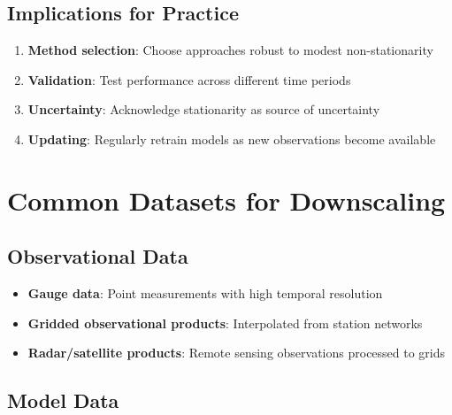 \documentclass[
  letterpaper,
  DIV=11,
  numbers=noendperiod]{scrreprt}
\providecommand{\tightlist}{%
  \setlength{\itemsep}{0pt}\setlength{\parskip}{0pt}}
\begin{document}
\subsection{Implications for Practice}\label{implications-for-practice}

\begin{enumerate}
\def\labelenumi{\arabic{enumi}.}
\tightlist
\item
  \textbf{Method selection}: Choose approaches robust to modest
  non-stationarity
\item
  \textbf{Validation}: Test performance across different time periods
\item
  \textbf{Uncertainty}: Acknowledge stationarity as source of
  uncertainty
\item
  \textbf{Updating}: Regularly retrain models as new observations become
  available
\end{enumerate}

\section{Common Datasets for
Downscaling}\label{common-datasets-for-downscaling}

\subsection{Observational Data}\label{observational-data}

\begin{itemize}
\tightlist
\item
  \textbf{Gauge data}: Point measurements with high temporal resolution
\item
  \textbf{Gridded observational products}: Interpolated from station
  networks
\item
  \textbf{Radar/satellite products}: Remote sensing observations
  processed to grids
\end{itemize}

\subsection{Model Data}\label{model-data}
\end{document}
